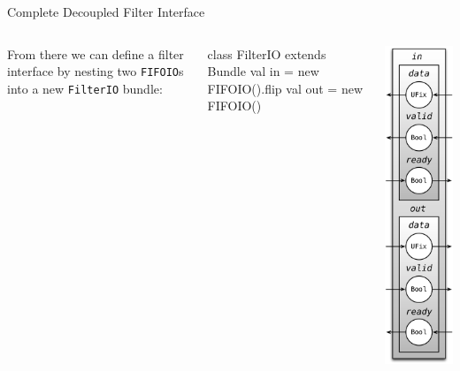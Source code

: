 \documentclass[xcolor=pdflatex,dvipsnames,table]{beamer}
\begin{document}
\begin{frame}[fragile]{Complete Decoupled Filter Interface}

\begin{columns}

From there we can define a filter interface by nesting two
\verb+FIFOIO+s into a new \verb+FilterIO+ bundle:

\begin{scala}
class FilterIO extends Bundle { 
  val in  = new FIFOIO().flip
  val out = new FIFOIO()
}
\end{scala}


\begin{center}
\includegraphics[height=0.9\textheight]{figs/decoupled-filter-io.pdf} 
\end{center}


\end{columns}
\end{frame}
\end{document}
